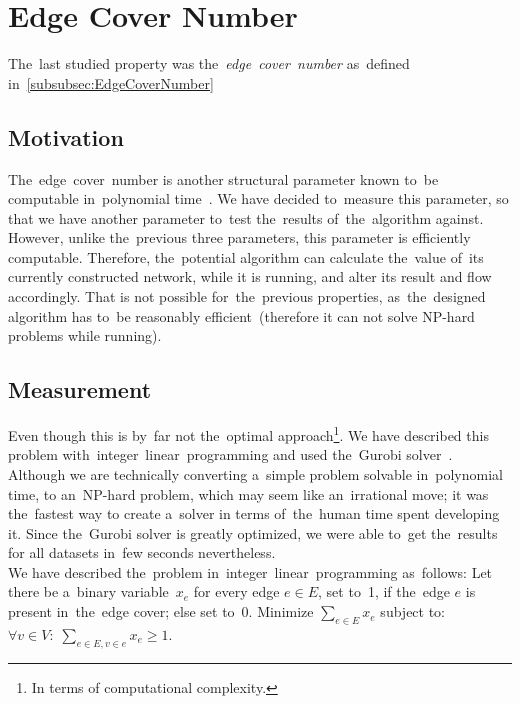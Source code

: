 \section{Edge Cover Number}
The~last studied property was the~\textit{edge~cover~number} as~defined in~\autoref{subsubsec:EdgeCoverNumber}
\subsection{Motivation}
The~edge~cover~number is another structural parameter known to~be computable in~polynomial time~\cite{Garey}. We have decided to~measure this parameter, so that we have another parameter to~test the~results of~the~algorithm against. However, unlike the~previous three parameters, this parameter is efficiently computable. Therefore, the~potential algorithm can calculate the~value of~its currently constructed network, while it is running, and alter its result and flow accordingly. That is not possible for~the~previous properties, as~the~designed algorithm has to~be reasonably efficient~(therefore it can not solve NP-hard problems while running).
\subsection{Measurement}
Even though this is by~far not the~optimal approach\footnote{In terms of computational complexity.}. We have described this problem with~integer~linear~programming and used the~Gurobi solver~\cite{gurobi}. Although we are technically converting a~simple problem solvable in~polynomial time, to an~NP-hard problem, which may seem like an~irrational move; it was the~fastest way to create a~solver in terms of~the~human time spent developing it. Since the~Gurobi solver is greatly optimized, we were able to~get the~results for all datasets in~few seconds nevertheless. \\
We have described the~problem in~integer~linear~programming as~follows: Let there be a~binary variable~$x_e$ for every edge $e \in E$, set to~1, if the~edge $e$ is present in~the~edge cover; else set to~0. Minimize $\sum_{e \in E} x_e$ subject to: $\forall v \in V:\;\sum_{e \in E, v \in e} x_e \geq 1$.
